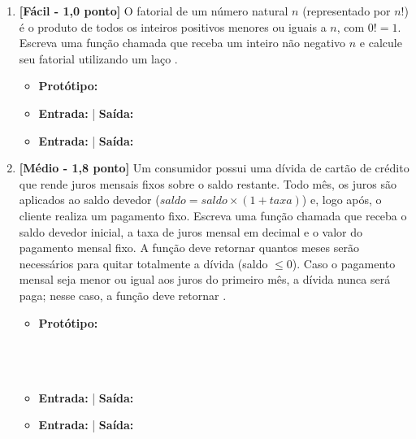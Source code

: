 \begin{enumerate}[label=\textbf{Q\arabic*.}, start=25]


\vspace{0.4cm}

\item \textbf{[Fácil - 1,0 ponto]} O fatorial de um número natural $n$ (representado por $n!$) é o produto de todos os inteiros positivos menores ou iguais a $n$, com $0! = 1$. Escreva uma função chamada  que receba um inteiro não negativo $n$ e calcule seu fatorial utilizando um laço .

\begin{itemize}[leftmargin=*]
    \item \textbf{Protótipo:}\newline {}
    \item \textbf{Entrada:}  | \textbf{Saída:} 
    \item \textbf{Entrada:}  | \textbf{Saída:} 
\end{itemize}



\vspace{0.4cm}

\item \textbf{[Médio - 1,8 ponto]} Um consumidor possui uma dívida de cartão de crédito que rende juros mensais fixos sobre o saldo restante. Todo mês, os juros são aplicados ao saldo devedor ($saldo = saldo \times (1 + taxa)$) e, logo após, o cliente realiza um pagamento fixo. Escreva uma função chamada  que receba o saldo devedor inicial, a taxa de juros mensal em decimal e o valor do pagamento mensal fixo. A função deve retornar quantos meses serão necessários para quitar totalmente a dívida (saldo $\le 0$). Caso o pagamento mensal seja menor ou igual aos juros do primeiro mês, a dívida nunca será paga; nesse caso, a função deve retornar .

\begin{itemize}[leftmargin=*]
    \item \textbf{Protótipo:}\newline {}\\\\\\\\
    \item \textbf{Entrada:}  | \textbf{Saída:} 
    \item \textbf{Entrada:}  | \textbf{Saída:} 
\end{itemize}


\end{enumerate}
